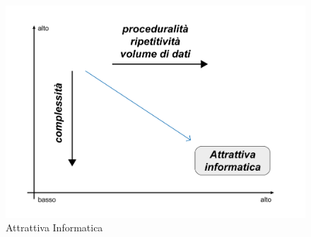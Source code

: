 \begin{figure}[!hbt]
\centering
\includegraphics[scale=0.55]{img/attrattiva.png}
\caption{Attrattiva Informatica}
\label{fig:attrattiva}
\end{figure}
\noindent
\newline


